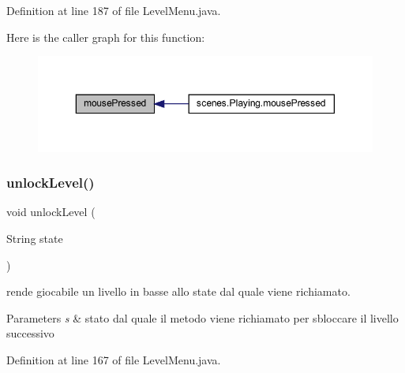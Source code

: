 Definition at line 187 of file Level\+Menu.\+java.

Here is the caller graph for this function\+:\nopagebreak
\begin{figure}[H]
\begin{center}
\leavevmode
\includegraphics[width=350pt]{classui_1_1_level_menu_aed82e1ce3dd3cf283d508c3ba3be70ef_icgraph}
\end{center}
\end{figure}
\mbox{\label{classui_1_1_level_menu_a90a96ba9679b7df9cc591d4c58430615}} 
\subsubsection{\texorpdfstring{unlock\+Level()}{unlockLevel()}}
{\footnotesize\ttfamily void unlock\+Level (\begin{DoxyParamCaption}\item[{String}]{state }\end{DoxyParamCaption})}



rende giocabile un livello in basse allo state dal quale viene richiamato. 


\begin{DoxyParams}{Parameters}
{\em s} & stato dal quale il metodo viene richiamato per sbloccare il livello successivo \\
\hline
\end{DoxyParams}


Definition at line 167 of file Level\+Menu.\+java.


